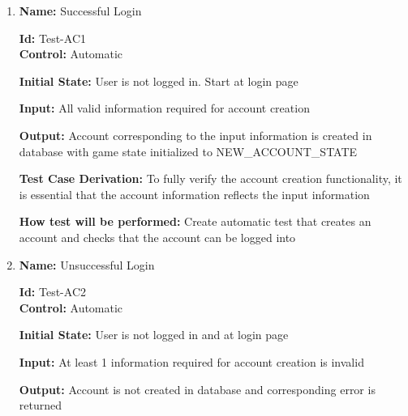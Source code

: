\documentclass[12pt, titlepage]{article}
\begin{document}
\begin{enumerate}


					
					
					

					


\item{\textbf{Name:} Successful Login } %

\textbf{Id:} Test-AC1 \label{Test-AC1} \\

\textbf{Control:} Automatic
					
\textbf{Initial State:} User is not logged in. Start at login page
					
\textbf{Input:} All valid information required for account creation
					
\textbf{Output:} Account corresponding to the input information is created in database with game state initialized to NEW\_ACCOUNT\_STATE

\textbf{Test Case Derivation:} To fully verify the account creation functionality, it is essential that the account information reflects the input information

\textbf{How test will be performed:} Create automatic test that creates an account and checks that the account can be logged into

\item{\textbf{Name:} Unsuccessful Login }%

\textbf{Id:} Test-AC2  \label{Test-AC2}\\

\textbf{Control: }Automatic
					
\textbf{Initial State:} User is not logged in and at login page
					
\textbf{Input:} At least 1 information required for account creation is invalid
					
\textbf{Output:} Account is not created in database and corresponding error is returned


\end{enumerate}
\end{document}
